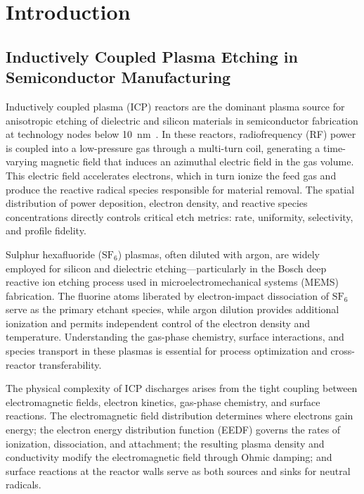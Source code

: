 \documentclass[11pt,a4paper]{report}
\newcommand{\SFsix}{\mathrm{SF}_6}
\begin{document}
\newpage
\tableofcontents
\newpage

\chapter{Introduction}
\label{ch:intro}

\section{Inductively Coupled Plasma Etching in Semiconductor Manufacturing}
\label{sec:intro_icp}

Inductively coupled plasma (ICP) reactors are the dominant plasma source for anisotropic etching of dielectric and silicon materials in semiconductor fabrication at technology nodes below \SI{10}{\nano\meter}~\cite{Lieberman2005}.  In these reactors, radiofrequency (RF) power is coupled into a low-pressure gas through a multi-turn coil, generating a time-varying magnetic field that induces an azimuthal electric field in the gas volume.  This electric field accelerates electrons, which in turn ionize the feed gas and produce the reactive radical species responsible for material removal.  The spatial distribution of power deposition, electron density, and reactive species concentrations directly controls critical etch metrics: rate, uniformity, selectivity, and profile fidelity.

Sulphur hexafluoride ($\SFsix$) plasmas, often diluted with argon, are widely employed for silicon and dielectric etching---particularly in the Bosch deep reactive ion etching process used in microelectromechanical systems (MEMS) fabrication.  The fluorine atoms liberated by electron-impact dissociation of $\SFsix$ serve as the primary etchant species, while argon dilution provides additional ionization and permits independent control of the electron density and temperature.  Understanding the gas-phase chemistry, surface interactions, and species transport in these plasmas is essential for process optimization and cross-reactor transferability.

The physical complexity of ICP discharges arises from the tight coupling between electromagnetic fields, electron kinetics, gas-phase chemistry, and surface reactions.  The electromagnetic field distribution determines where electrons gain energy; the electron energy distribution function (EEDF) governs the rates of ionization, dissociation, and attachment; the resulting plasma density and conductivity modify the electromagnetic field through Ohmic damping; and surface reactions at the reactor walls serve as both sources and sinks for neutral radicals.
\end{document}
